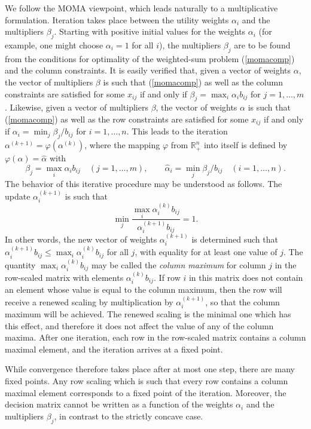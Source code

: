 \documentclass{article}
\newcommand{\mR}{\mathbb{R}}
\renewcommand{\phi}{\varphi}
\newcommand{\ki}{^{(k)}}
\newcommand{\kn}{^{(k+1)}}
\newcommand{\pOT}{\phi}
\theoremstyle{definition}
\begin{document}
We follow the MOMA viewpoint, which leads naturally to a multiplicative formulation. Iteration takes place between the utility weights $\alpha_i$ and the multipliers $\beta_j$. Starting with positive initial values for the weights $\alpha_i$ (for example, one might choose $\alpha_i = 1$ for all $i$), the multipliers $\beta_j$ are to be found from the conditions for optimality of the weighted-sum problem (\ref{momacomp}) and the column constraints. It is easily verified that, given a vector of weights $\alpha$, the vector of multipliers $\beta$ is such that (\ref{momacomp}) as well as the column constraints are satisfied for some $x_{ij}$ if and only if
$\beta_j = \max_i \alpha_i b_{ij}$ for $j=1,\dots,m$.
Likewise, given a vector of multipliers $\beta$, the vector of weights $\alpha$ is such that (\ref{momacomp}) as well as the row constraints are satisfied for some $x_{ij}$ if and only if
$\alpha_i = \min_j \beta_j/b_{ij}$ for $i=1,\dots,n$.
This leads to the iteration $\alpha\kn = \pOT(\alpha\ki)$, where the mapping $\pOT$ from $\mR^n_+$ into itself is defined by $\pOT(\alpha) = \hat{\alpha}$ with
\begin{equation} \label{pot}
\beta_j = \max_i \alpha_i b_{ij} \quad (j=1,\dots,m), \qquad
\hat{\alpha}_i = \min_j \beta_j/b_{ij} \quad (i=1,\dots,n).
\end{equation}
\vskip2mm\noindent
The behavior of this iterative procedure may be understood as follows. The update $\alpha_i^{(k+1)}$ is such that
$$
\min_j \frac{\max_i \alpha_i^{(k)} b_{ij}}{\alpha_i^{(k+1)}b_{ij}} = 1.
$$
In other words, the new vector of weights $\alpha_i^{(k+1)}$ is determined such that
$
\alpha_i^{(k+1)}b_{ij} \leq \max_i \alpha_i^{(k)} b_{ij}
$
for all $j$, with equality for at least one value of $j$. The quantity $\max_i \alpha_i^{(k)} b_{ij}$ may be called the \emph{column maximum} for column $j$ in the row-scaled matrix with elements $\alpha_i^{(k)} b_{ij}$. If row $i$ in this matrix does not contain an element whose value is equal to the column maximum, then the row will receive a renewed scaling by multiplication by $\alpha_i^{(k+1)}$, so that the column maximum will be achieved. The renewed scaling is the minimal one which has this effect, and therefore it does not affect the value of any of the column maxima. After one iteration, each row in the row-scaled matrix contains a column maximal element, and the iteration arrives at a fixed point.

While convergence therefore takes place after at most one step, there are many fixed points. Any row scaling which is such that every row contains a column maximal element corresponds to a fixed point of the iteration. Moreover, the decision matrix cannot be written as a function of the weights $\alpha_i$ and the multipliers $\beta_j$, in contrast to the strictly concave case.
\end{document}
